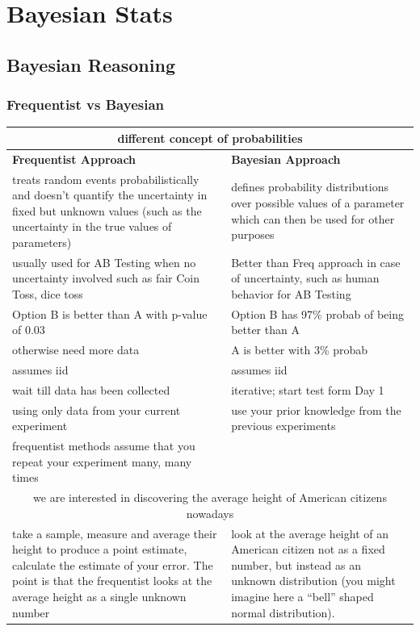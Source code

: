 \documentclass{beamer}
\begin{document}
\section{Bayesian Stats}

\subsection{Bayesian Reasoning}

\begin{frame}[allowframebreaks]\frametitle{Frequentist vs Bayesian}

	\begin{table}
	\begin{tabular}{l|l}
		\multicolumn{2}{c}{different concept of probabilities}
		\\ \hline
		
		\textbf{Frequentist Approach} & \textbf{Bayesian Approach}
		\\ \hline
		treats random events probabilistically and doesn’t quantify the uncertainty in fixed but unknown values (such as the uncertainty in the true values of parameters)
		& defines probability distributions over possible values of a parameter which can then be used for other purposes
		\\ \hline
		usually used for AB Testing when no uncertainty involved such as fair Coin Toss, dice toss
		& Better than Freq approach in case of uncertainty, such as human behavior for AB Testing
		\\ \hline
		Option B is better than A with p-value of 0.03
		& Option B has 97\% probab of being better than A
		\\ \hline
		otherwise need more data
		& A is better with 3\% probab
		\\ \hline
		assumes iid
		& assumes iid
		\\ \hline
		wait till data has been collected
		& iterative; start test form Day 1
		\\ \hline
		using only data from your current experiment
		& use your prior knowledge from the previous experiments
		\\ \hline
		frequentist methods assume that you repeat your experiment many, many times & 
		\\ \hline
		\multicolumn{2}{c}{we are interested in discovering the average height of American citizens nowadays}\\
		take a sample, measure and average their height to produce a point estimate, calculate the estimate of your error. The point is that the frequentist looks at the average height as a single unknown number
		& look at the average height of an American citizen not as a fixed number, but instead as an unknown distribution (you might imagine here a “bell” shaped normal distribution).
		\\ \hline
	\end{tabular}
	\end{table}


\end{frame}
\end{document}
